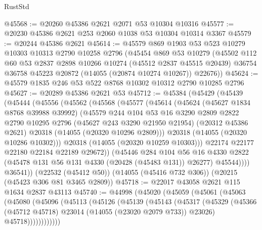 \begin{lexlean}{RustStd}
\begin{coremodule}
@45568 := @20260 @45386 @2621 @2071 @53 @10304 @10316
@45577 := @20230 @45386 @2621 @253 @2060 @1038 @53 @10304 @10314 @3367
@45579 := @20244 @45386 @2621
@45614 := @45579
    @869
    @1903
    @53
    @523
    @10279
    @10303
    @10313
    @2790
    @10258
    @2796
    (@45454
      @869
      @53
      @10279
      (@45502
        @112
        @60
        @53
        @2837
        @2898
        @10266
        @10274
        (@45512 @2837 @45515 @20439)
        @36754
        @36758
        @45223
        @20872
        (@14055 (@20874 @10274 @10267))
        @22676))
@45624 := @45579 @1835 @246 @53 @522 @8768 @10302 @10312 @2790 @10285 @2796
@45627 := @20289 @45386 @2621 @53
@45712 := @45384
    (@45429
      (@45439
        (@45444
          (@45556
            (@45562
              (@45568
                (@45577
                  (@45614
                    (@45624
                      (@45627 @1834 @8768 @39988 @39992)
                      (@45579
                        @244
                        @104
                        @53
                        @16
                        @3290
                        @2809
                        @2822
                        @2790
                        @10295
                        @2796
                        (@45627 @243 @3290 @21950 @21954)
                        (@20312 @45386 @2621)
                        @20318
                        (@14055 (@20320 @10296 @2809)))
                      @20318
                      (@14055 (@20320 @10286 @10302)))
                    @20318
                    (@14055 (@20320 @10259 @10303)))
                  @22174
                  @22177
                  @22180
                  @22184
                  @22189
                  @29672))
              (@45446
                @284
                @104
                @56
                @16
                @4330
                @2822
                (@45478 @131 @56 @131 @4330 (@20428 (@45483 @131)) @26277)
                @45544))))
        @36541))
    (@22532 (@45412 @50))
    (@14055 (@45416 @732 @306))
    (@20215 (@45423 @306 @81 @3465 @2809))
@45718 := @22017 @43058 @2621 @115 @1634 @2837 @43113
@45740 := @44998
    (@45020
      (@45059
        (@45061
          (@45063
            (@45080
              (@45096
                (@45113
                  (@45126
                    (@45139
                      (@45143
                        (@45317
                          (@45329
                            (@45366 (@45712 @45718) @23014 (@14055 (@23020 @2079 @733)) @23026)
                            @45718))))))))))))

\end{coremodule}
\end{lexlean}
